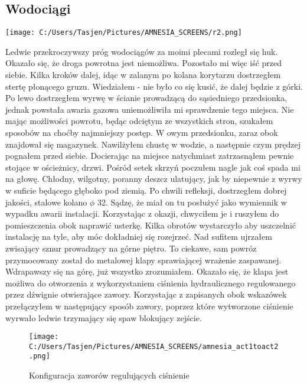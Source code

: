 \documentclass[12pt,a4paper]{report}
\begin{document}
\subsection{Wodociągi} 
\begin{center}
\texttt{[image: C:/Users/Tasjen/Pictures/AMNESIA\_SCREENS/r2.png]} \\
\end{center}
 
Ledwie przekroczywszy próg wodociągów za moimi plecami rozległ się huk. Okazało się, że droga powrotna jest niemożliwa. Pozostało mi więc iść przed siebie. Kilka kroków dalej, idąc w zalanym po kolana korytarzu dostrzegłem stertę płonącego gruzu. Wiedziałem - nie było co się kusić, że dalej będzie z górki. Po lewo dostrzegłem wyrwę w ścianie prowadzącą do sąsiedniego przedsionka, jednak powstała awaria gazowa uniemożliwiła mi sprawdzenie tego miejsca. Nie mając możliwości powrotu, będąc odciętym ze wszystkich stron, szukałem sposobów na choćby najmniejszy postęp. W owym przedsionku, zaraz obok znajdował się magazynek. Nawilżyłem chustę w wodzie, a następnie czym prędzej pognałem przed siebie. Docierając na miejsce natychmiast zatrzasnąłem pewnie stojące w ościeżnicy, drzwi. Pośród setek skrzyń poczułem nagle jak coś spada mi na głowę. Chłodny, wilgotny, poranny deszcz ulatujący, jak by niepewnie z wyrwy w suficie będącego głęboko pod ziemią. Po chwili refleksji, dostrzegłem dobrej jakości, stalowe kolano $ \phi $ 32. Sądzę, że miał on tu posłużyć jako wymiennik w wypadku awarii instalacji. Korzystając z okazji, chwyciłem je i ruszyłem do pomieszczenia obok naprawić usterkę. Kilka obrotów wystarczyło aby uszczelnić instalację na tyle, aby móc dokładniej się rozejrzeć. Nad sufitem ujrzałem zwisający sznur prowadzący na górne piętro. To ciekawe, sam powróz przymocowany został do metalowej klapy sprawiającej wrażenie zaspawanej. Wdrapawszy się na górę, już wszystko zrozumiałem. Okazało się, że klapa jest możliwa do otworzenia z wykorzystaniem ciśnienia hydraulicznego regulowanego przez dźwignie otwierające zawory. Korzystając z zapisanych obok wskazówek przełączyłem w następujący sposób zawory, poprzez które wytworzone ciśnienie wyrwało ledwie trzymający się spaw blokujący zejście. 
\begin{figure}[H]
\begin{center}
\texttt{[image: C:/Users/Tasjen/Pictures/AMNESIA\_SCREENS/amnesia\_act1toact2.png]} \\
\end{center}
\caption{Konfiguracja zaworów regulujących ciśnienie}
\end{figure}
\end{document}

